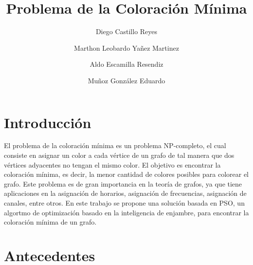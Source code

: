\documentclass[9pt,a4paper,twoside]{tau-class/tau}
\title{Problema de la Coloración Mínima}%
\author[a]{Diego Castillo Reyes}
\author[a]{Marthon Leobardo Yañez Martinez}
\author[a]{Aldo Escamilla Resendiz}
\author[a]{Muñoz González Eduardo}
\affil[a]{Investigadores en formación, ESCOM, IPN}
\begin{document}
	
    \maketitle 
    \thispagestyle{firststyle} 
    \tauabstract

\section{Introducción}

    El problema de la coloración mínima es un problema NP-completo, el cual consiste en asignar un color a cada vértice de un grafo de tal manera que dos vértices adyacentes no tengan el mismo color.
    El objetivo es encontrar la coloración mínima, es decir, la menor cantidad de colores posibles para colorear el grafo.
    Este problema es de gran importancia en la teoría de grafos, ya que tiene aplicaciones en la asignación de horarios, asignación de frecuencias, asignación de canales, entre otros.
    En este trabajo se propone una solución basada en PSO, un algortmo de optimización basado en la inteligencia de enjambre, para encontrar la coloración mínima de un grafo.

\section{Antecedentes}
\end{document}
